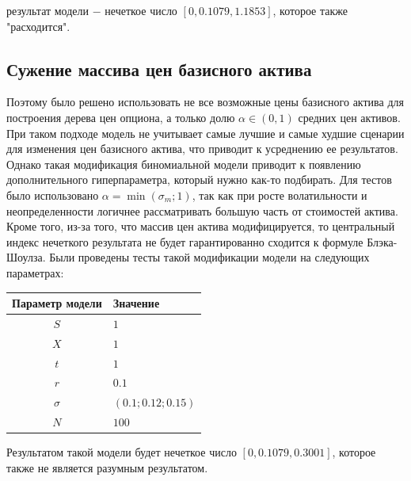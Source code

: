 \documentclass[a4paper,12pt]{extarticle} %
\begin{document}
	 результат модели $-$ нечеткое число $[0, 0.1079, 1.1853]$, которое также "расходится". 
	 
	\subsection{Сужение массива цен базисного актива}
	Поэтому было решено использовать не все возможные цены базисного актива для построения дерева цен опциона, а только долю $\alpha \in (0,1)$ средних цен активов. При таком подходе модель не учитывает самые лучшие и самые худшие сценарии для изменения цен базисного актива, что приводит к усреднению ее результатов. Однако такая модификация биномиальной модели приводит к появлению дополнительного гиперпараметра, который нужно как-то подбирать. Для тестов было использовано $\alpha=\min(\sigma_m; 1)$, так как при росте волатильности и неопределенности логичнее рассматривать большую часть от стоимостей актива. Кроме того, из-за того, что массив цен актива модифицируется, то центральный индекс нечеткого результата не будет гарантированно сходится к формуле Блэка-Шоулза. Были проведены тесты такой модификации модели на следующих параметрах: 
	\begin{center}
		\begin{tabular}{|c|l|}
			\hline
			\textbf{Параметр модели} & \textbf{Значение} \\
			\hline
			$S$ & $1$ \\
			$X$ & $1$ \\
			$t$ & $1$ \\
			$r$ & $0.1$ \\
			$\sigma$ & $(0.1; 0.12; 0.15)$ \\
			$N$ & $100$ \\
			\hline
		\end{tabular}
	\end{center}
	
	Результатом такой модели будет нечеткое число $[0, 0.1079, 0.3001]$, которое также не является разумным результатом. 
	
\end{document}
